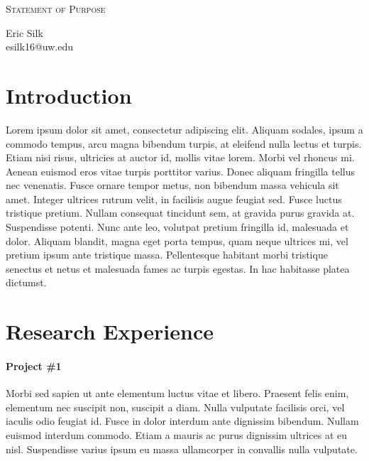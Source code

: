 \documentclass[letterpaper]{article}
\makeatletter
\newcommand{\soptitle}{Statement of Purpose}
\newcommand{\yourname}{Eric Silk}
\newcommand{\youremail}{esilk16@uw.edu}
\makeatother
\begin{document}
\begin{center}{\huge \scshape \soptitle}\end{center}
\begin{center}\vspace{0.2em} {\Large \yourname\\}
  {\youremail}\end{center}

\section*{Introduction}
Lorem ipsum dolor sit amet, consectetur adipiscing elit. Aliquam
sodales, ipsum a commodo tempus, arcu magna bibendum turpis, at
eleifend nulla lectus et turpis. Etiam nisi risus, ultricies at auctor
id, mollis vitae lorem. Morbi vel rhoncus mi. Aenean euismod eros
vitae turpis porttitor varius. Donec aliquam fringilla tellus nec
venenatis. Fusce ornare tempor metus, non bibendum massa vehicula sit
amet. Integer ultrices rutrum velit, in facilisis augue feugiat sed.
Fusce luctus tristique pretium. Nullam consequat tincidunt sem, at
gravida purus gravida at. Suspendisse potenti. Nunc ante leo, volutpat
pretium fringilla id, malesuada et dolor. Aliquam blandit, magna eget
porta tempus, quam neque ultrices mi, vel pretium ipsum ante tristique
massa. Pellentesque habitant morbi tristique senectus et netus et
malesuada fames ac turpis egestas. In hac habitasse platea dictumst.

\section*{Research Experience}
\paragraph{Project \#1}
Morbi sed sapien ut ante elementum luctus vitae et libero. Praesent
felis enim, elementum nec suscipit non, suscipit a diam. Nulla
vulputate facilisis orci, vel iaculis odio feugiat id. Fusce in dolor
interdum ante dignissim bibendum. Nullam euismod interdum commodo.
Etiam a mauris ac purus dignissim ultrices at eu nisl. Suspendisse
varius ipsum eu massa ullamcorper in convallis nulla vulputate.
\end{document}
